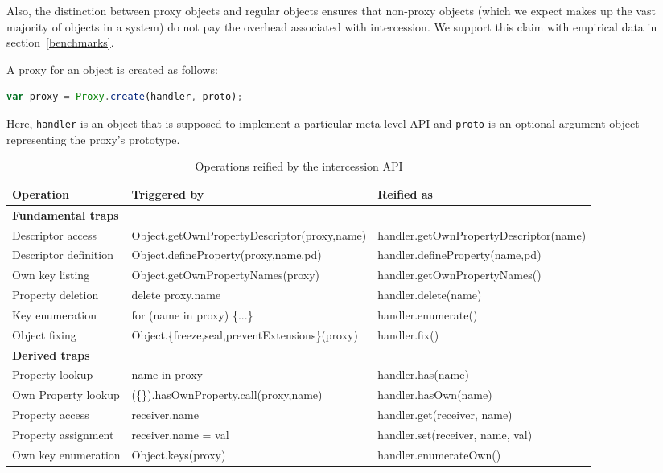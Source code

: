 \documentclass{acm_proc_article-sp}
\begin{document}
Also, the distinction between proxy objects and regular objects ensures that non-proxy objects (which we expect makes up the vast majority of objects in a system) do not pay the overhead associated with intercession. We support this claim with empirical data in section~\ref{benchmarks}.

A proxy for an object is created as follows:

\begin{lstlisting}[language=javascript]
var proxy = Proxy.create(handler, proto);
\end{lstlisting}

Here, \texttt{handler} is an object that is supposed to implement a particular meta-level API and \texttt{proto} is an optional argument object representing the proxy's prototype.

\begin{table*}[t]
  \begin{center}
    \begin{small}
    \begin{tabular}{|l|p{}|p{}|}
    \hline
    \textbf{Operation} & \textbf{Triggered by} & \textbf{Reified as}\\
    \hline
    \multicolumn{3}{|l|}{\textbf{Fundamental traps}}\\
    \hline
    Descriptor access & Object.getOwnPropertyDescriptor(proxy,name) & handler.getOwnPropertyDescriptor(name)\\
    \hline
    Descriptor definition & Object.defineProperty(proxy,name,pd) & handler.defineProperty(name,pd)\\
    \hline
    Own key listing & Object.getOwnPropertyNames(proxy) & handler.getOwnPropertyNames()\\
    \hline
    Property deletion & delete proxy.name & handler.delete(name)\\
    \hline
    Key enumeration & for (name in proxy) \{...\} & handler.enumerate()\\
    \hline
    Object fixing & Object.\{freeze,seal,preventExtensions\}(proxy) & handler.fix()\\
    \hline
    \multicolumn{3}{|l|}{\textbf{Derived traps}}\\
    \hline
    Property lookup & name in proxy & handler.has(name)\\
    \hline
    Own Property lookup & (\{\}).hasOwnProperty.call(proxy,name) & handler.hasOwn(name)\\
    \hline
    Property access & receiver.name & handler.get(receiver, name)\\
    \hline
    Property assignment & receiver.name = val & handler.set(receiver, name, val)\\
    \hline
    Own key enumeration & Object.keys(proxy) & handler.enumerateOwn()\\
    \hline
    \end{tabular}
    \end{small}
  \end{center}
  \caption{Operations reified by the intercession API}
  \label{tab:operations}
\end{table*}
\end{document}

